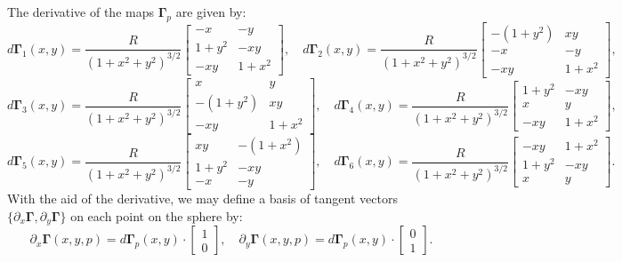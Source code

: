 The derivative of the maps $\boldsymbol{\Gamma}_p$ are given by:
\begin{equation*}
	d\boldsymbol{\Gamma}_{1}(x,y) = \frac{R}{{(1 + x^2 + y^2)}^{3/2}}
	\begin{bmatrix}
		-x & -y \\
	 	 1+y^2  & -xy \\
		 -xy  & 1+x^2
	\end{bmatrix}, \quad
	d\boldsymbol{\Gamma}_{2}(x,y) = \frac{R}{{(1 + x^2 + y^2)}^{3/2}}
	\begin{bmatrix}
		-(1+y^2) & xy \\
		 -x &  -y \\
		 -xy &  1+x^2
	\end{bmatrix},
\end{equation*}
\begin{equation*}
	d\boldsymbol{\Gamma}_{3}(x,y) = \frac{R}{{(1 + x^2 + y^2)}^{3/2}}
	\begin{bmatrix}
		 x &  y \\
		-(1+y^2) & xy \\
		 -xy &  1+x^2
	\end{bmatrix}, \quad
	d\boldsymbol{\Gamma}_{4}(x,y) = \frac{R}{{(1 + x^2 + y^2)}^{3/2}}	
	\begin{bmatrix}
		 1+y^2 &  -xy \\
		 x & y \\
		 -xy &  1+x^2
	\end{bmatrix},
\end{equation*}
\begin{equation*}
	d\boldsymbol{\Gamma}_{5}(x,y) = \frac{R}{{(1 + x^2 + y^2)}^{3/2}}	
	\begin{bmatrix}
		 xy  & -(1+x^2) \\
	 	 1+y^2  &  -xy \\
		-x & -y
	\end{bmatrix}, \quad
	d\boldsymbol{\Gamma}_{6}(x,y) = \frac{R}{{(1 + x^2 + y^2)}^{3/2}}
	\begin{bmatrix}
		 -xy  &  1+x^2 \\
		 1+y^2  &  -xy \\
		 x &  y
	\end{bmatrix}.
\end{equation*}
With the aid of the derivative, we may define a basis of tangent vectors 
$\{{\partial_x \boldsymbol{\Gamma}},  {\partial_y \boldsymbol{\Gamma}}\}$ on each point on the sphere by:
\begin{equation*}
	{\partial_x \boldsymbol{\boldsymbol{\Gamma}}}(x,y,p) = d\boldsymbol{\boldsymbol{\Gamma}}_{p}(x,y) \cdot
	\begin{bmatrix}
		 1 \\
		 0
	\end{bmatrix}, \quad
	{\partial_y \boldsymbol{\boldsymbol{\Gamma}}}(x,y,p) = d\boldsymbol{\boldsymbol{\Gamma}}_{p}(x,y) \cdot
	\begin{bmatrix}
		 0 \\
		 1
	\end{bmatrix}.
\end{equation*}
